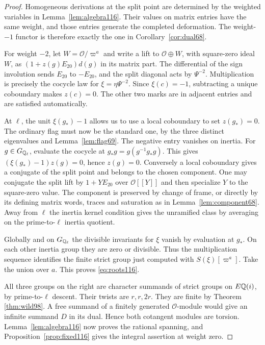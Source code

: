 \documentclass[a4paper,11pt]{article}
\theoremstyle{definition}
\theoremstyle{remark}
\numberwithin{equation}{section}
\newcommand{\OO}{\mathcal O}
\begin{document}
\begin{proof}
Homogeneous derivations at the split point are determined by
the weighted variables in Lemma~\ref{lem:algebra116}. Their
values on matrix entries have the same weight, and those entries
generate the completed deformation. The weight-\(-1\) functor
is therefore exactly the one in Corollary~\ref{cor:dual68}.

For weight \(-2\), let \(W=\OO/\varpi^a\) and write a lift to
\(\OO\oplus W\), with square-zero ideal \(W\), as
\((1+z(g)E_{20})d(g)\) in its matrix part. The differential of
the sign involution sends \(E_{20}\) to \(-E_{20}\), and the
split diagonal acts by \(\Psi^{-2}\). Multiplication is
precisely the cocycle law for \(\xi=\eta\Psi^{-2}\).
Since \(\xi(c)=-1\), subtracting a unique coboundary makes
\(z(c)=0\). The other two marks are in adjacent entries and
are satisfied automatically.

At \(\ell\), the unit \(\xi(g_*)-1\) allows us to use a local
coboundary to set \(z(g_*)=0\). The ordinary flag must now be the
standard one, by the three distinct eigenvalues and
Lemma~\ref{lem:flag69}. The negative entry vanishes on inertia.
For \(g\in G_{\mathbb Q_\ell}\), evaluate the cocycle at
\(g_*g=g(g^{-1}g_*g)\). This gives
\((\xi(g_*)-1)z(g)=0\), hence \(z(g)=0\). Conversely a local
coboundary gives a conjugate of the split point and belongs to
the chosen component. One may conjugate the split lift by
\(1+Y E_{20}\) over \(\OO[[Y]]\) and then specialize \(Y\)
to the square-zero value. The component is preserved by change
of frame, or directly by its defining matrix words, traces and
saturation as in Lemma~\ref{lem:component68}. Away from \(\ell\)
the inertia kernel condition gives the unramified class by
averaging on the prime-to-\(\ell\) inertia quotient.

Globally and on \(G_{\mathbb Q_\ell}\) the divisible invariants for
\(\xi\) vanish by evaluation at \(g_*\). On each other inertia
group they are zero or divisible. Thus the multiplication sequence
identifies the finite strict group just computed with
\(S(\xi)[\varpi^a]\). Take the union over \(a\). This proves
\eqref{eq:roots116}.

All three groups on the right are character summands of strict
groups on \(E\mathbb Q(i)\), by prime-to-\(\ell\) descent. Their twists
are \(r,r,2r\). They are finite by
Theorem \ref{thm:wild98}.
A free summand of a finitely generated \(\OO\)-module would
give an infinite summand \(D\) in its dual. Hence both cotangent
modules are torsion. Lemma~\ref{lem:algebra116} now proves the
rational spanning, and Proposition~\ref{prop:fixed116} gives
the integral assertion at weight zero.
\end{proof}
\end{document}
